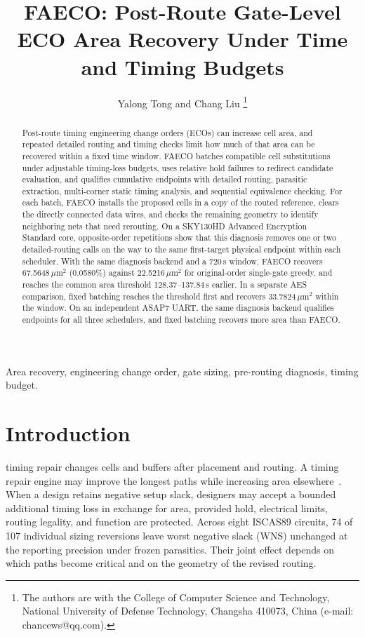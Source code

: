 \documentclass[journal]{IEEEtran}
\newcommand{\um}{\ensuremath{\mu\mathrm{m}^{2}}}
\begin{document}
\title{FAECO: Post-Route Gate-Level ECO Area Recovery Under Time and Timing Budgets}
\author{Yalong Tong and Chang Liu%
\thanks{The authors are with the College of Computer Science and Technology, National University of Defense Technology, Changsha 410073, China (e-mail: chancews@qq.com).}}
\maketitle

\begin{abstract}
Post-route timing engineering change orders (ECOs) can increase cell area, and repeated detailed routing and timing checks limit how much of that area can be recovered within a fixed time window.
FAECO batches compatible cell substitutions under adjustable timing-loss budgets, uses relative hold failures to redirect candidate evaluation, and qualifies cumulative endpoints with detailed routing, parasitic extraction, multi-corner static timing analysis, and sequential equivalence checking.
For each batch, FAECO installs the proposed cells in a copy of the routed reference, clears the directly connected data wires, and checks the remaining geometry to identify neighboring nets that need rerouting.
On a SKY130HD Advanced Encryption Standard core, opposite-order repetitions show that this diagnosis removes one or two detailed-routing calls on the way to the same first-target physical endpoint within each scheduler.
With the same diagnosis backend and a 720\,s window, FAECO recovers 67.5648\,\um{} (0.0580\%) against 22.5216\,\um{} for original-order single-gate greedy, and reaches the common area threshold 128.37--137.84\,s earlier.
In a separate AES comparison, fixed batching reaches the threshold first and recovers 33.7824\,\um{} within the window. On an independent ASAP7 UART, the same diagnosis backend qualifies endpoints for all three schedulers, and fixed batching recovers more area than FAECO.
\end{abstract}

\begin{IEEEkeywords}
Area recovery, engineering change order, gate sizing, pre-routing diagnosis, timing budget.
\end{IEEEkeywords}

\section{Introduction}

 timing repair changes cells and buffers after placement and routing. A timing repair engine may improve the longest paths while increasing area elsewhere~\cite{openroad}. When a design retains negative setup slack, designers may accept a bounded additional timing loss in exchange for area, provided hold, electrical limits, routing legality, and function are protected. Across eight ISCAS89 circuits, 74 of 107 individual sizing reversions leave worst negative slack (WNS) unchanged at the reporting precision under frozen parasitics. Their joint effect depends on which paths become critical and on the geometry of the revised routing.
\end{document}
